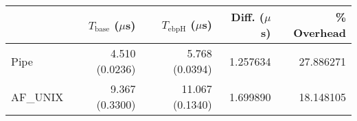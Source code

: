 \begin{tabular}{>{\ttfamily}lrrrr}
\toprule
\multicolumn{1}{l}{Type} & $T_\text{base}$ ($\mu$s) & $T_\text{ebpH}$ ($\mu$s) &  Diff. ($\mu$s) &  \% Overhead \\
\midrule
                    Pipe &           4.510 (0.0236) &           5.768 (0.0394) &        1.257634 &    27.886271 \\
                AF\_UNIX &           9.367 (0.3300) &          11.067 (0.1340) &        1.699890 &    18.148105 \\
\bottomrule
\end{tabular}
